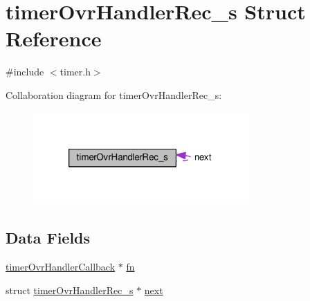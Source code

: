 \hypertarget{structtimerOvrHandlerRec__s}{\section{timer\+Ovr\+Handler\+Rec\+\_\+s Struct Reference}
\label{structtimerOvrHandlerRec__s}
}


{\ttfamily \#include $<$timer.\+h$>$}



Collaboration diagram for timer\+Ovr\+Handler\+Rec\+\_\+s\+:\nopagebreak
\begin{figure}[H]
\begin{center}
\leavevmode
\includegraphics[width=235pt]{structtimerOvrHandlerRec__s__coll__graph}
\end{center}
\end{figure}
\subsection*{Data Fields}
\begin{DoxyCompactItemize}
\item 
\hyperlink{timer_8h_ac1be25992c7674daac71d98fbf1966bf}{timer\+Ovr\+Handler\+Callback} $\ast$ \hyperlink{structtimerOvrHandlerRec__s_a32b2ff008ebdc1a89e8638fe737519c7}{fn}
\item 
struct \hyperlink{structtimerOvrHandlerRec__s}{timer\+Ovr\+Handler\+Rec\+\_\+s} $\ast$ \hyperlink{structtimerOvrHandlerRec__s_a07f1f4a529c61a17b368e34aaac4f8bd}{next}
\end{DoxyCompactItemize}



